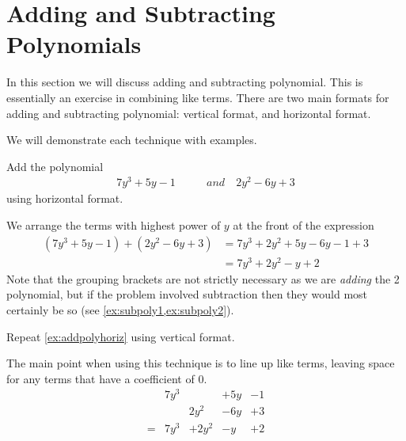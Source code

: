 \section{Adding and Subtracting Polynomials}
In this section we will discuss adding and subtracting polynomial. This is essentially
an exercise in combining like terms. There are two main formats for adding and subtracting
polynomial: vertical format, and horizontal format. 

We will demonstrate each technique with examples.
\begin{myexample}\label{ex:addpolyhoriz}
Add the polynomial
\begin{align*}
	7y^3+5y-1 & \qquad and \quad 2y^2-6y+3 
\end{align*}
using horizontal format.
\end{myexample}
\begin{myProof}
	We arrange the terms with highest power of $y$ at the front of the expression
	\begin{align*}
		(7y^3+5y-1) + (2y^2-6y+3) & =		7y^3+2y^2+5y-6y-1+3 \\
		                          & =		7y^3+2y^2-y+2       
	\end{align*}
	Note that the grouping brackets are not strictly necessary as we are {\em adding} the 2
	polynomial, but if the problem involved subtraction then they would most certainly be so 
	(see \cref{ex:subpoly1,ex:subpoly2}).
\end{myProof}

\begin{myexample}\label{ex:polyvert}
Repeat \cref{ex:addpolyhoriz} using vertical format.
\end{myexample}
\begin{myProof}
	The main \gls{point} when using this technique is to line up like terms, leaving space for any terms
	that have a \gls{coefficient} of $0$.
	\begin{equation*}
		\begin{array}{ccccc}
			  & 7y^3 &       & +5y & -1 \\
			  &      & 2y^2  & -6y & +3 \\\hline
			= & 7y^3 & +2y^2 & -y  & +2 
		\end{array}
	\end{equation*}
\end{myProof}

